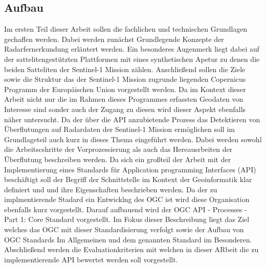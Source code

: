 \subsection{Aufbau}
Im ersten Teil dieser Arbeit sollen die fachlichen und technischen Grundlagen gechaffen werden. 
Dabei werden zunächst Grundlegende Konzepte der Radarfernerkundung erläutert werden. Ein besonderes
Augenmerk liegt dabei auf der sattelitengestützten Plattformen mit eines synthetischen Apetur zu denen 
die beiden Satteliten der Sentinel-1 Mission zählen. 
Anschließend sollen die Ziele sowie die Struktur das der Sentinel-1 Mission zugrunde liegenden Copernicus 
Programm der Europäischen Union vorgestellt werden. Da im Kontext dieser Arbeit nicht nur die im Rahmen dieses
Programmes erfassten Geodaten von Interesse sind sonder auch der Zugang zu diesen wird dieser Aspekt ebenfalls
näher untersucht.
Da der über die API anzubietende Prozess das Detektieren von Überflutungen auf Radardaten der Sentinel-1 Mission
ermöglichen soll im Grundlageteil auch kurz in dieses Thema eingeführt werden. Dabei werden sowohl die Arbeitscshritte
der Vorprozessierung als auch das Hereausrbeiten der Überflutung beschreiben werden.
Da sich ein großteil der Arbeit mit der Implementierung eines Standards für Application programming Interfaces (API)
beschäftigt soll der Begriff der Schnittstelle im Kontext der Geoinformatik klar definiert und und ihre Eigenschaften 
beschrieben werden. Da der zu implmentierende Stadard ein Entwicklng des OGC ist wird diese Organisation ebenfalls 
kurz vorgestellt. Darauf aufbauend wird der OGC API - Processes - Part 1: Core Standard vorgestellt. Im Fokus dieser 
Beschreibung liegt das Ziel welches das OGC mit dieser Standardisierung verfolgt sowie der Aufbau von OGC Standards Im
Allgemeinen und dem genannten Standard im Besonderen. 
Abschließend werden die Evaluationkriterien mit welchen in dieser ARbeit die zu implementierende API bewertet werden 
soll vorgestellt. 

